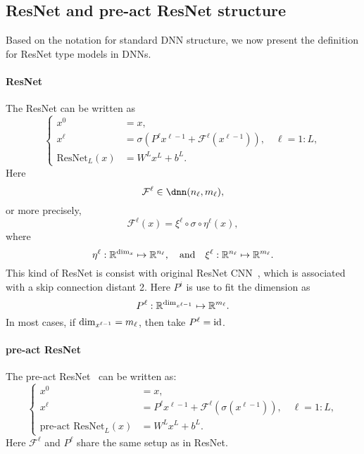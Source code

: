 \subsection{ResNet and pre-act ResNet structure}
Based on the notation for standard DNN structure, we now present
the definition for ResNet type models in DNNs.

\paragraph{ResNet}
The ResNet can be written as
\begin{equation}\label{ori-ResNet-dnn}
\begin{cases}
x^0 &= x, \\
x^{\ell} &= \sigma \left( P^\ell x^{\ell-1} + \mathcal{F}^{\ell} (x^{\ell-1}) \right), \quad \ell = 1:L ,\\
{\text{ResNet}}_{L}(x) &=   W^L x^{L}  + b^L.
\end{cases}
\end{equation}
Here
\begin{equation}\label{eq:F-ResNet}
\mathcal{F}^{\ell}  \in  \dnn(n_\ell, m_\ell),
\end{equation}
or more precisely, 
\begin{equation}\label{key}
\mathcal{F}^{\ell}(x) = \xi^{\ell} \circ \sigma \circ \eta^{\ell} (x),
\end{equation}
where
\begin{equation}\label{key}
\eta^\ell: \mathbb{R}^{{\rm dim}_x} \mapsto \mathbb{R}^{n_\ell}, \quad \text{and} \quad \xi^{\ell}:  \mathbb{R}^{n_\ell} \mapsto \mathbb{R}^{m_\ell}.
\end{equation}
This kind of ResNet is consist with original ResNet CNN~\cite{he2016deep}, which is associated with a skip connection distant 2. 
Here $P^i$ is use to fit the dimension as
\begin{equation}\label{eq:P^i}
P^\ell: \mathbb{R}^{{\rm dim}_{x^{\ell-1}}} \mapsto \mathbb{R}^{m_\ell}.
\end{equation}
In most cases, if ${\rm dim}_{x^{\ell-1}} = m_\ell$, then take $P^\ell = {\rm id}$.

\paragraph{pre-act ResNet} 
The pre-act ResNet~\cite{he2016identity} can be written as:
\begin{equation}\label{ori-iResNet-dnn}
\begin{cases}
x^0 &= x, \\
x^{\ell} &=  P^\ell x^{\ell-1} + \mathcal{F}^{\ell} \left( \sigma (x^{\ell-1}) \right), \quad \ell = 1:L ,\\
{\text{pre-act ResNet}}_{L}(x) &=  W^L x^{L} + b^L.
\end{cases}
\end{equation}
Here $\mathcal{F}^{\ell}$ and $P^\ell$ share the same setup as in ResNet.


